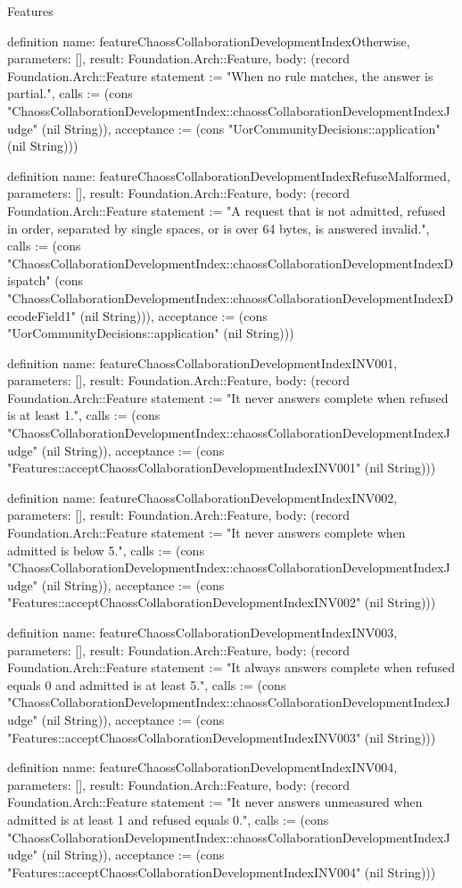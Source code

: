 \begin{lexlean}{Features}
\begin{semanticmodule}
definition{
  name: featureChaossCollaborationDevelopmentIndexOtherwise,
  parameters: [],
  result: Foundation.Arch::Feature,
  body: (record Foundation.Arch::Feature {statement := "When no rule matches, the answer is partial.", calls := (cons "ChaossCollaborationDevelopmentIndex::chaossCollaborationDevelopmentIndexJudge" (nil String)), acceptance := (cons "UorCommunityDecisions::application" (nil String))})
}

definition{
  name: featureChaossCollaborationDevelopmentIndexRefuseMalformed,
  parameters: [],
  result: Foundation.Arch::Feature,
  body: (record Foundation.Arch::Feature {statement := "A request that is not admitted, refused in order, separated by single spaces, or is over 64 bytes, is answered invalid.", calls := (cons "ChaossCollaborationDevelopmentIndex::chaossCollaborationDevelopmentIndexDispatch" (cons "ChaossCollaborationDevelopmentIndex::chaossCollaborationDevelopmentIndexDecodeField1" (nil String))), acceptance := (cons "UorCommunityDecisions::application" (nil String))})
}

definition{
  name: featureChaossCollaborationDevelopmentIndexINV001,
  parameters: [],
  result: Foundation.Arch::Feature,
  body: (record Foundation.Arch::Feature {statement := "It never answers complete when refused is at least 1.", calls := (cons "ChaossCollaborationDevelopmentIndex::chaossCollaborationDevelopmentIndexJudge" (nil String)), acceptance := (cons "Features::acceptChaossCollaborationDevelopmentIndexINV001" (nil String))})
}

definition{
  name: featureChaossCollaborationDevelopmentIndexINV002,
  parameters: [],
  result: Foundation.Arch::Feature,
  body: (record Foundation.Arch::Feature {statement := "It never answers complete when admitted is below 5.", calls := (cons "ChaossCollaborationDevelopmentIndex::chaossCollaborationDevelopmentIndexJudge" (nil String)), acceptance := (cons "Features::acceptChaossCollaborationDevelopmentIndexINV002" (nil String))})
}

definition{
  name: featureChaossCollaborationDevelopmentIndexINV003,
  parameters: [],
  result: Foundation.Arch::Feature,
  body: (record Foundation.Arch::Feature {statement := "It always answers complete when refused equals 0 and admitted is at least 5.", calls := (cons "ChaossCollaborationDevelopmentIndex::chaossCollaborationDevelopmentIndexJudge" (nil String)), acceptance := (cons "Features::acceptChaossCollaborationDevelopmentIndexINV003" (nil String))})
}

definition{
  name: featureChaossCollaborationDevelopmentIndexINV004,
  parameters: [],
  result: Foundation.Arch::Feature,
  body: (record Foundation.Arch::Feature {statement := "It never answers unmeasured when admitted is at least 1 and refused equals 0.", calls := (cons "ChaossCollaborationDevelopmentIndex::chaossCollaborationDevelopmentIndexJudge" (nil String)), acceptance := (cons "Features::acceptChaossCollaborationDevelopmentIndexINV004" (nil String))})
}


\end{semanticmodule}
\end{lexlean}
